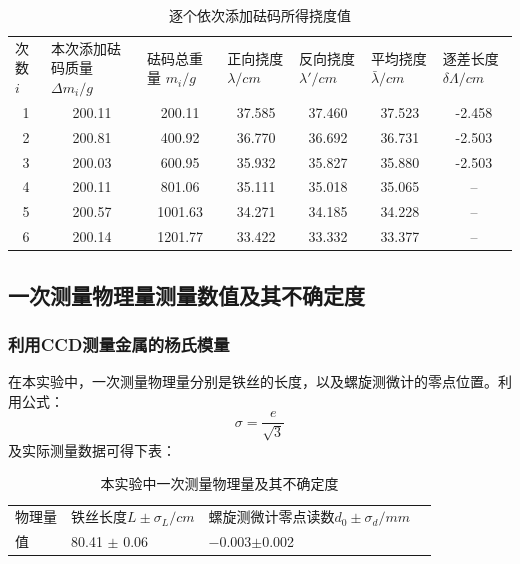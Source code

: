 \documentclass{ctexart}
\begin{document}
\begin{table}[H]
  \centering
  \caption{逐个依次添加砝码所得挠度值}
  \resizebox{\textwidth}{!}
  {
    \begin{tabular}{ccccccc}
    \multicolumn{1}{l}{次数 $i$} & \multicolumn{1}{l}{本次添加砝码质量 $\Delta m_i /g$} & \multicolumn{1}{l}{砝码总重量 $m_i /g$} & \multicolumn{1}{l}{正向挠度 $\lambda /cm$} & \multicolumn{1}{l}{反向挠度$\lambda '/cm$} & \multicolumn{1}{l}{平均挠度 $\bar{\lambda}/cm$} & \multicolumn{1}{l}{逐差长度 $\delta \Lambda/cm$} \\
    1     & 200.11 & 200.11 & 37.585 & 37.460 & 37.523 & -2.458  \\
    2     & 200.81 & 400.92  & 36.770 & 36.692 & 36.731 & -2.503  \\
    3     & 200.03 & 600.95  & 35.932 & 35.827 & 35.880 & -2.503  \\
    4     & 200.11 & 801.06  & 35.111 & 35.018 & 35.065 & -- \\
    5     & 200.57 & 1001.63  & 34.271 & 34.185 & 34.228 & -- \\
    6     & 200.14 & 1201.77  & 33.422 & 33.332 & 33.377 & -- \\
    \end{tabular}%
  }
  \label{tab:addlabel}%
\end{table}%
\subsection{一次测量物理量测量数值及其不确定度}
\subsubsection{利用CCD测量金属的杨氏模量}
在本实验中，一次测量物理量分别是铁丝的长度，以及螺旋测微计的零点位置。利用公式：
$$\sigma=\frac{e}{\sqrt{3}}$$
及实际测量数据可得下表：
\begin{table}[H]
  \centering
  \caption{本实验中一次测量物理量及其不确定度}
  
    \begin{tabular}{lllr}
    物理量   & 铁丝长度$L \pm \sigma_L /cm$ & 螺旋测微计零点读数$d_0 \pm \sigma_d /mm$ &  \\
    值     & 80.41 $\pm$ 0.06 & $-$0.003$\pm$0.002 &  \\
    \end{tabular}%
  \label{tab:addlabel}%
\end{table}%
\end{document}

